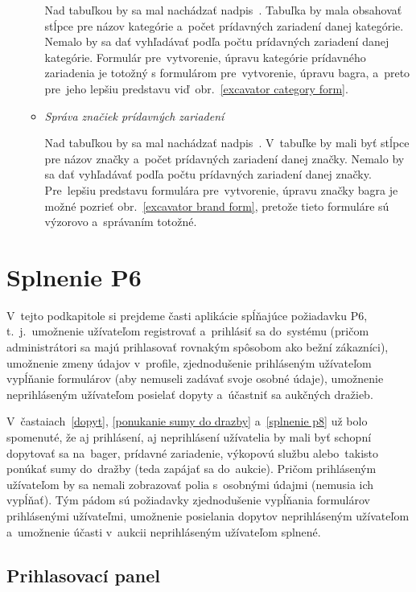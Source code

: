 \begin{itemize}
\begin{itemize}
Nad tabuľkou by sa mal nachádzať nadpis~. Tabuľka by mala obsahovať stĺpce pre názov kategórie a~počet prídavných zariadení danej kategórie. Nemalo by sa dať vyhľadávať podľa počtu prídavných zariadení danej kategórie. Formulár pre~vytvorenie, úpravu kategórie prídavného zariadenia je totožný s formulárom pre~vytvorenie, úpravu bagra, a~preto pre~jeho lepšiu predstavu viď~obr.~\ref{excavator category form}.

\item \textit{Správa značiek prídavných zariadení}

Nad tabuľkou by sa mal nachádzať nadpis~. V~tabuľke by mali byť stĺpce pre názov značky a~počet prídavných zariadení danej značky. Nemalo by sa dať vyhľadávať podľa počtu prídavných zariadení danej značky. Pre~lepšiu predstavu formulára pre~vytvorenie, úpravu značky bagra je možné pozrieť obr.~\ref{excavator brand form}, pretože tieto formuláre sú výzorovo a~správaním totožné.
\end{itemize}
\end{itemize}

\section{Splnenie P6}
\label{splnenie p6}

V~tejto podkapitole si prejdeme časti aplikácie spĺňajúce požiadavku P6, t.~j.~umožnenie užívateľom registrovať a~prihlásiť sa do~systému (pričom administrátori sa majú prihlasovať rovnakým spôsobom ako bežní zákazníci), umožnenie zmeny údajov v~profile, zjednodušenie prihláseným užívateľom vypĺňanie formulárov (aby nemuseli zadávať svoje osobné údaje), umožnenie neprihláseným užívateľom posielať dopyty a~účastniť sa aukčných dražieb.

V~častaiach~\ref{dopyt}, \ref{ponukanie sumy do drazby} a~\ref{splnenie p8} už bolo spomenuté, že aj prihlásení, aj neprihlásení užívatelia by mali byť schopní dopytovať sa na~bager, prídavné zariadenie, výkopovú službu alebo~takisto ponúkať sumy do~dražby (teda zapájať sa do~aukcie). Pričom prihláseným užívateľom by sa nemali zobrazovať polia s~osobnými údajmi (nemusia ich vypĺňať). Tým pádom sú požiadavky zjednodušenie vypĺňania formulárov prihlásenými užívateľmi, umožnenie posielania dopytov neprihláseným užívateľom a~umožnenie účasti v~aukcii neprihláseným užívateľom splnené.

\subsection{Prihlasovací panel}


